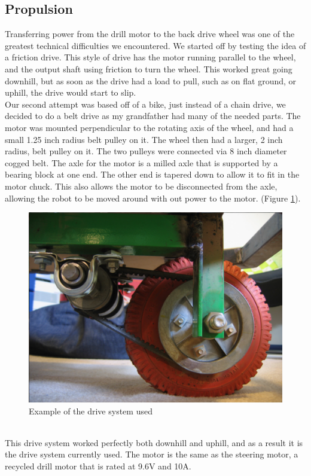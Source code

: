 \documentclass{article}
\begin{document}
\subsection{Propulsion}
Transferring power from the drill motor to the back drive wheel was one of the greatest technical difficulties we encountered. We started off by testing the idea of a friction drive. This style of drive has the motor running parallel to the wheel, and the output shaft using friction to turn the wheel. This worked great going downhill, but as soon as the drive had a load to pull, such as on flat ground, or uphill, the drive would start to slip.\\
Our second attempt was based off of a bike, just instead of a chain drive, we decided to do a belt drive as my grandfather had many of the needed parts. The motor was mounted perpendicular to the rotating axis of the wheel, and had a small 1.25 inch radius belt pulley on it. The wheel then had a larger, 2 inch radius, belt pulley on it. The two pulleys were connected via 8 inch diameter cogged belt. The axle for the motor is a milled axle that is supported by a bearing block at one end. The other end is tapered down to allow it to fit in the motor chuck. This also allows the motor to be disconnected from the axle, allowing the robot to be moved around with out power to the motor. (Figure \ref{reardrive}).
\begin{figure}[htp]
  \begin{center}
\includegraphics[scale=0.25]{reardrive}
  \end{center}
  \caption{Example of the drive system used}
\label{reardrive}
\end{figure}\\
This drive system worked perfectly both downhill and uphill, and as a result it is the drive system currently used. The motor is the same as the steering motor, a recycled drill motor that is rated at 9.6V and 10A.\\
\end{document}
